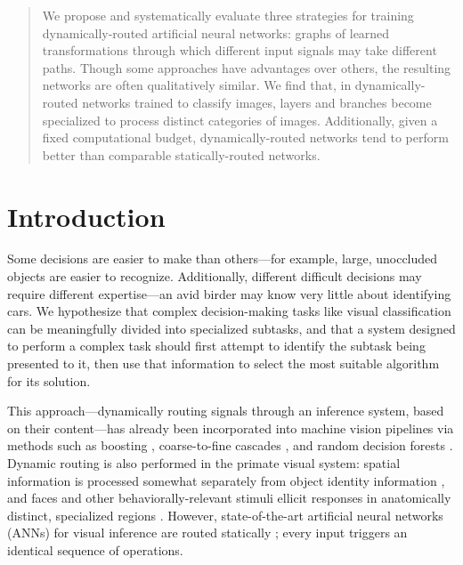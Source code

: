 \documentclass{article}
\begin{document}
 
  \printAffiliationsAndNotice{}
  
  \begin{abstract}
    We propose and systematically evaluate three strategies for training dynamically-routed artificial neural networks: graphs of learned transformations through which different input signals may take different paths. Though some approaches have advantages over others, the resulting networks are often qualitatively similar. We find that, in dynamically-routed networks trained to classify images, layers and branches become specialized to process distinct categories of images. Additionally, given a fixed computational budget, dynamically-routed networks tend to perform better than comparable statically-routed networks.
  \end{abstract}

  \section{Introduction}
  
  Some decisions are easier to make than others---for example, large, unoccluded objects are easier to recognize. Additionally, different difficult decisions may require different expertise---an avid birder may know very little about identifying cars. We hypothesize that complex decision-making tasks like visual classification can be meaningfully divided into specialized subtasks, and that a system designed to perform a complex task should first attempt to identify the subtask being presented to it, then use that information to select the most suitable algorithm for its solution.
   
  This approach---dynamically routing signals through an inference system, based on their content---has already been incorporated into machine vision pipelines via methods such as boosting \cite{viola2005detecting}, coarse-to-fine cascades \cite{zhou2013extensive}, and random decision forests \cite{ho1995random}. Dynamic routing is also performed in the primate visual system: spatial information is processed somewhat separately from object identity information \cite{goodale1992separate}, and faces and other behaviorally-relevant stimuli ellicit responses in anatomically distinct, specialized regions \cite{moeller2008patches,kornblith2013network}. However, state-of-the-art artificial neural networks (ANNs) for visual inference are routed statically \cite{simonyan2014very,he2016deep,dosovitskiy2015flownet,newell2016stacked}; every input triggers an identical sequence of operations.
  
\end{document}
